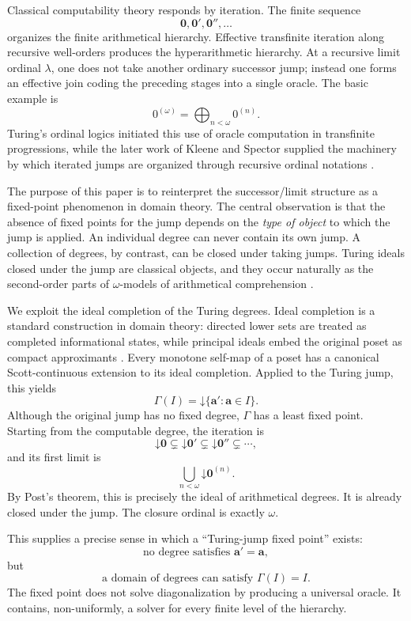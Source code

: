 \documentclass[11pt]{article}
\theoremstyle{definition}
\theoremstyle{remark}
\newcommand{\down}{\mathord{\downarrow}}
\newcommand{\bigjoin}{\bigoplus}
\begin{document}
Classical computability theory responds by iteration. The finite sequence
\[
\mathbf0,\mathbf0',\mathbf0'',\ldots
\]
organizes the finite arithmetical hierarchy. Effective transfinite iteration along recursive well-orders produces the hyperarithmetic hierarchy. At a recursive limit ordinal $\lambda$, one does not take another ordinary successor jump; instead one forms an effective join coding the preceding stages into a single oracle. The basic example is
\[
0^{(\omega)}=\bigjoin_{n<\omega}0^{(n)}.
\]
Turing's ordinal logics initiated this use of oracle computation in transfinite progressions, while the later work of Kleene and Spector supplied the machinery by which iterated jumps are organized through recursive ordinal notations \cite{Turing1939,Spector1955,Slaman2005}.

The purpose of this paper is to reinterpret the successor/limit structure as a fixed-point phenomenon in domain theory. The central observation is that the absence of fixed points for the jump depends on the \emph{type of object} to which the jump is applied. An individual degree can never contain its own jump. A collection of degrees, by contrast, can be closed under taking jumps. Turing ideals closed under the jump are classical objects, and they occur naturally as the second-order parts of $\omega$-models of arithmetical comprehension \cite{Simpson2009}.

We exploit the ideal completion of the Turing degrees. Ideal completion is a standard construction in domain theory: directed lower sets are treated as completed informational states, while principal ideals embed the original poset as compact approximants \cite{AbramskyJung1994,Scott1972}. Every monotone self-map of a poset has a canonical Scott-continuous extension to its ideal completion. Applied to the Turing jump, this yields
\[
\Gamma(I)=\down\{\mathbf a':\mathbf a\in I\}.
\]
Although the original jump has no fixed degree, $\Gamma$ has a least fixed point. Starting from the computable degree, the iteration is
\[
\down\mathbf0
\subsetneq
\down\mathbf0'
\subsetneq
\down\mathbf0''
\subsetneq\cdots,
\]
and its first limit is
\[
\bigcup_{n<\omega}\down\mathbf0^{(n)}.
\]
By Post's theorem, this is precisely the ideal of arithmetical degrees. It is already closed under the jump. The closure ordinal is exactly $\omega$.

This supplies a precise sense in which a ``Turing-jump fixed point'' exists:
\[
\text{no degree satisfies }\mathbf a'=\mathbf a,
\]
but
\[
\text{a domain of degrees can satisfy }\Gamma(I)=I.
\]
The fixed point does not solve diagonalization by producing a universal oracle. It contains, non-uniformly, a solver for every finite level of the hierarchy.
\end{document}
